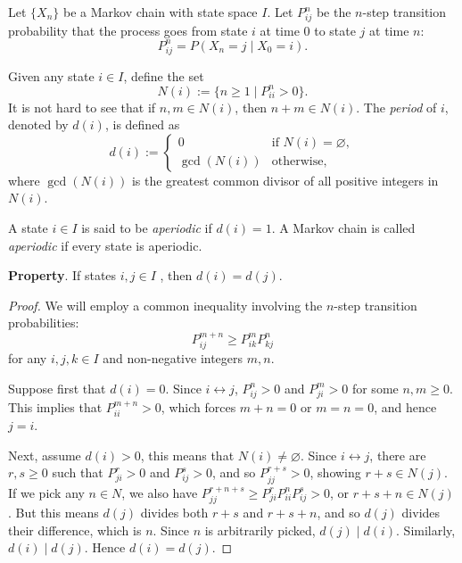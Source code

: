 \documentclass[12pt]{article}
\begin{document}
Let $\lbrace X_n \rbrace$ be a  Markov chain with state space $I$.  Let $P_{ij}^{n}$ be the $n$-step transition probability that the process goes from state $i$ at time $0$ to state $j$ at time $n$:
$$P_{ij}^{n}=P(X_n=j\mid X_0=i).$$

Given any state $i\in I$, define the set $$N(i):=\lbrace n\ge 1\mid P_{ii}^n>0\rbrace.$$  It is not hard to see that if $n,m\in N(i)$, then $n+m\in N(i)$.  The \emph{period} of $i$, denoted by $d(i)$, is defined as 
$$
d(i):=\begin{cases}
0&\text{if } N(i)=\varnothing,\\
\gcd (N(i))&\text{otherwise},
\end{cases}
$$ 
where $\gcd(N(i))$ is the greatest common divisor of all positive integers in $N(i)$.

A state $i\in I$ is said to be \emph{aperiodic} if $d(i)=1$.  A Markov chain is called \emph{aperiodic} if every state is aperiodic.

\textbf{Property}. If states $i,j\in I$ , then $d(i)=d(j)$.

\begin{proof} We will employ a common inequality involving the $n$-step transition probabilities:
$$P_{ij}^{m+n}\ge P_{ik}^m P_{kj}^n$$
for any $i,j,k\in I$ and non-negative integers $m,n$.

Suppose first that $d(i)=0$.  Since $i\leftrightarrow j$, 
$\displaystyle{ P_{ij}^n>0}$ and $P_{ji}^m>0$ for some $n,m\ge 0$.  This implies that $P_{ii}^{m+n}>0$, which forces $m+n=0$ or $m=n=0$, and hence $j=i$.

Next, assume $d(i)>0$, this means that $N(i)\ne \varnothing$.  Since $i\leftrightarrow j$, there are $r,s\ge 0$ such that $P_{ji}^r>0$ and $P_{ij}^s>0$, and so $P_{jj}^{r+s}>0$, showing $r+s\in N(j)$.  If we pick any $n\in N$, we also have $\displaystyle{ P_{jj}^{r+n+s}\ge P_{ji}^r P_{ii}^n P_{ij}^s>0 }$, or $r+s+n\in N(j)$.  But this means $d(j)$ divides both $r+s$ and $r+s+n$, and so $d(j)$ divides their difference, which is $n$.  Since $n$ is arbitrarily picked, $d(j)\mid d(i)$.  Similarly, $d(i)\mid d(j)$.  Hence $d(i)=d(j)$.
\end{proof}
\end{document}
